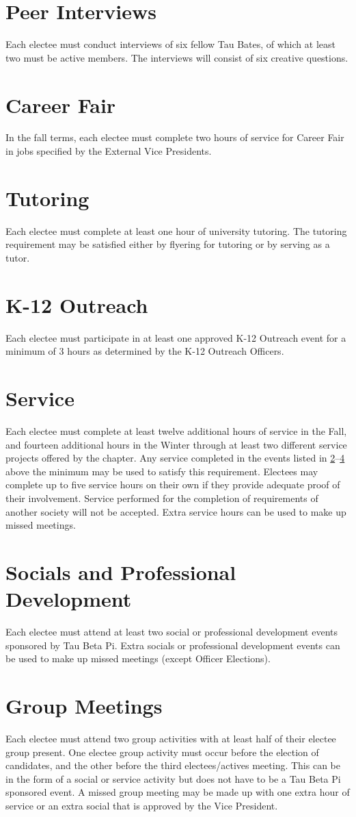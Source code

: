 \section{Peer Interviews} Each electee must conduct interviews of six fellow Tau Bates, of which at least two must be active members. The interviews will consist of six creative questions. 
\section{Career Fair}\label{ugrad:CF} In the fall terms, each electee must complete two hours of service for Career Fair in jobs specified by the External Vice Presidents. 
\section{Tutoring} Each electee must complete at least one hour of university tutoring. The tutoring requirement may be satisfied either by flyering for tutoring or by serving as a tutor.
\section{K-12 Outreach} \label{ugrad:MindSET} Each electee must participate in at least one approved K-12 Outreach event for a minimum of 3 hours as determined by the K-12 Outreach Officers.
\section{Service} Each electee must complete at least twelve additional hours of service in the Fall, and fourteen additional hours in the Winter through at least two different service projects offered by the chapter. Any service completed in the events listed in \ref{ugrad:CF}--\ref{ugrad:MindSET} above the minimum may be used to satisfy this requirement. Electees may complete up to five service hours on their own if they provide adequate proof of their involvement. Service performed for the completion of requirements of another society will not be accepted. Extra service hours can be used to make up missed meetings.
\section{Socials and Professional Development} Each electee must attend at least two social or professional development events sponsored by Tau Beta Pi. Extra socials or professional development events can be used to make up missed meetings (except Officer Elections).
\section{Group Meetings} \label{group_meetings} Each electee must attend two group activities with at least half of their electee group present. One electee group activity must occur before the election of candidates, and the other before the third electees/actives meeting. This can be in the form of a social or service activity but does not have to be a Tau Beta Pi sponsored event. A missed group meeting may be made up with one extra hour of service or an extra social that is approved by the Vice President.
